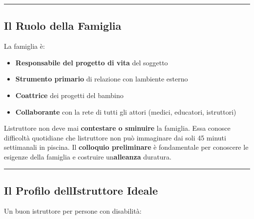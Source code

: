 \documentclass[a4paper,11pt]{article}
\providecommand{\tightlist}{%
  \setlength{\itemsep}{0pt}\setlength{\parskip}{0pt}}
\begin{document}
\begin{center}\rule{0.5\linewidth}{0.5pt}\end{center}

\subsection{Il Ruolo della Famiglia}\label{il-ruolo-della-famiglia}

La famiglia è:

\begin{itemize}
      \tightlist
      \item
            \textbf{Responsabile del progetto di vita} del soggetto
      \item
            \textbf{Strumento primario} di relazione con
            l\textquotesingle ambiente esterno
      \item
            \textbf{Coattrice} dei progetti del bambino
      \item
            \textbf{Collaborante} con la rete di tutti gli attori (medici,
            educatori, istruttori)
\end{itemize}

L\textquotesingle istruttore non deve mai \textbf{contestare o sminuire}
la famiglia. Essa conosce difficoltà quotidiane che
l\textquotesingle istruttore non può immaginare dai soli 45 minuti
settimanali in piscina. Il \textbf{colloquio preliminare} è fondamentale
per conoscere le esigenze della famiglia e costruire
un\textquotesingle{}\textbf{alleanza} duratura.

\begin{center}\rule{0.5\linewidth}{0.5pt}\end{center}

\subsection{Il Profilo dell\textquotesingle Istruttore
      Ideale}\label{il-profilo-dellistruttore-ideale-1}

Un buon istruttore per persone con disabilità:
\end{document}

